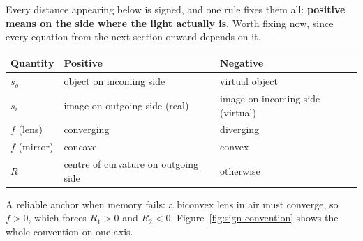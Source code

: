 Every distance appearing below is signed, and one rule fixes them all: \textbf{positive means on the side where the light actually is}. Worth fixing now, since every equation from the next section onward depends on it.

\begin{center}
\begin{tabular}{lll}
\toprule
Quantity & Positive & Negative \\
\midrule
$s_o$ & object on incoming side & virtual object \\
$s_i$ & image on outgoing side (real) & image on incoming side (virtual) \\
$f$ (lens) & converging & diverging \\
$f$ (mirror) & concave & convex \\
$R$ & centre of curvature on outgoing side & otherwise \\
\bottomrule
\end{tabular}
\end{center}

A reliable anchor when memory fails: a biconvex lens in air must converge, so $f > 0$, which forces $R_1 > 0$ and $R_2 < 0$. Figure~\ref{fig:sign-convention} shows the whole convention on one axis.

